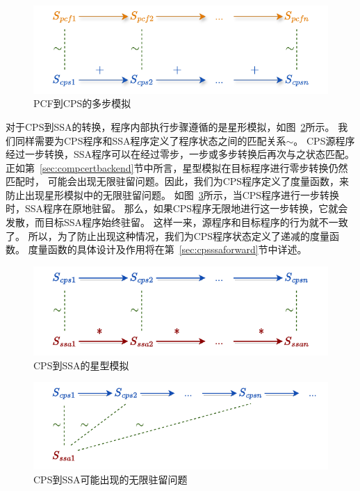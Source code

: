 \begin{figure}[htbp]
    \centering
    \vspace{2ex}
    \includegraphics[width=0.75\linewidth]{figures/plus.drawio.pdf}
    \caption{PCF到CPS的多步模拟}\label{plus}
\end{figure}

对于CPS到SSA的转换，程序内部执行步骤遵循的是星形模拟，如图~\ref{star}所示。
我们同样需要为CPS程序和SSA程序定义了程序状态之间的匹配关系$\sim$。
CPS源程序经过一步转换，SSA程序可以在经过零步，一步或多步转换后再次与之状态匹配。
正如第~\ref{sec:compcertbackend}节中所言，星型模拟在目标程序进行零步转换仍然匹配时，
可能会出现无限驻留问题。因此，我们为CPS程序定义了度量函数，来防止出现星形模拟中的无限驻留问题。
如图~\ref{stutter}所示，当CPS程序进行一步转换时，SSA程序在原地驻留。
那么，如果CPS程序无限地进行这一步转换，它就会发散，而目标SSA程序始终驻留。
这样一来，源程序和目标程序的行为就不一致了。
所以，为了防止出现这种情况，我们为CPS程序状态定义了递减的度量函数。
度量函数的具体设计及作用将在第~\ref{sec:cpsssaforward}节中详述。

\begin{figure}[htbp]
    \centering
    \vspace{2ex}
    \includegraphics[width=0.75\linewidth]{figures/star.drawio.pdf}
    \caption{CPS到SSA的星型模拟}\label{star}
\end{figure}

\begin{figure}[htbp]
    \centering
    \vspace{2ex}
    \includegraphics[width=0.75\linewidth]{figures/stutter.drawio.pdf}
    \caption{CPS到SSA可能出现的无限驻留问题}\label{stutter}
\end{figure}

